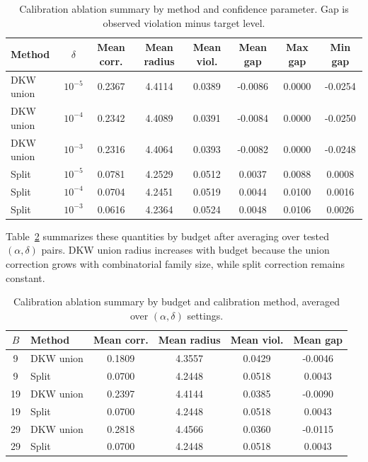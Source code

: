 \documentclass[accepted]{uai2026}
\theoremstyle{plain}
\theoremstyle{definition}
\theoremstyle{remark}
\begin{document}
\begin{table}[h]
\centering
\caption{Calibration ablation summary by method and confidence parameter. Gap is observed violation minus target level.}
\label{tab:f1_calibration_method_delta}
\scriptsize
\begin{tabular}{l c c c c c c c}
\hline
Method & $\delta$ & Mean corr. & Mean radius & Mean viol. & Mean gap & Max gap & Min gap \\
\hline
DKW union & $10^{-5}$ & 0.2367 & 4.4114 & 0.0389 & -0.0086 & 0.0000 & -0.0254 \\
DKW union & $10^{-4}$ & 0.2342 & 4.4089 & 0.0391 & -0.0084 & 0.0000 & -0.0250 \\
DKW union & $10^{-3}$ & 0.2316 & 4.4064 & 0.0393 & -0.0082 & 0.0000 & -0.0248 \\
Split & $10^{-5}$ & 0.0781 & 4.2529 & 0.0512 & 0.0037 & 0.0088 & 0.0008 \\
Split & $10^{-4}$ & 0.0704 & 4.2451 & 0.0519 & 0.0044 & 0.0100 & 0.0016 \\
Split & $10^{-3}$ & 0.0616 & 4.2364 & 0.0524 & 0.0048 & 0.0106 & 0.0026 \\
\hline
\end{tabular}
\end{table}

Table~\ref{tab:f1_calibration_budget_method} summarizes these quantities by budget after averaging over tested $(\alpha,\delta)$ pairs. DKW union radius increases with budget because the union correction grows with combinatorial family size, while split correction remains constant.

\begin{table}[h]
\centering
\caption{Calibration ablation summary by budget and calibration method, averaged over $(\alpha,\delta)$ settings.}
\label{tab:f1_calibration_budget_method}
\small
\begin{tabular}{c l c c c c}
\hline
$B$ & Method & Mean corr. & Mean radius & Mean viol. & Mean gap \\
\hline
9 & DKW union & 0.1809 & 4.3557 & 0.0429 & -0.0046 \\
9 & Split & 0.0700 & 4.2448 & 0.0518 & 0.0043 \\
19 & DKW union & 0.2397 & 4.4144 & 0.0385 & -0.0090 \\
19 & Split & 0.0700 & 4.2448 & 0.0518 & 0.0043 \\
29 & DKW union & 0.2818 & 4.4566 & 0.0360 & -0.0115 \\
29 & Split & 0.0700 & 4.2448 & 0.0518 & 0.0043 \\
\hline
\end{tabular}
\end{table}
\end{document}
